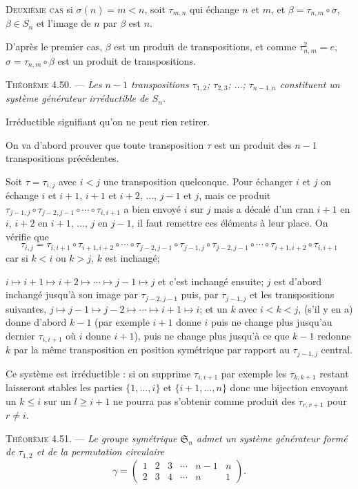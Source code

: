 \textsc{Deuxième cas} si $\sigma(n)=m<n$, soit $\tau_{m,n}$ qui échange $n$ et $m$, et $\beta=\tau_{n,m}\circ\sigma$, $\beta\in S_n$ et l'image de $n$ par $\beta$ est $n$.

D'après le premier cas, $\beta$ est un produit de transpositions, et comme $\tau_{n,m}^{2}=e$, $\sigma=\tau_{n,m}\circ\beta$ est un produit de transpositions. \bookend

\medskip\noindent\textsc{Théorème 4.50.} --- \emph{Les $n-1$ transpositions $\tau_{1,2}$; $\tau_{2,3}$; $\ldots$; $\tau_{n-1,n}$ constituent un système générateur irréductible de $S_n$.}

Irréductible signifiant qu'on ne peut rien retirer.

On va d'abord prouver que toute transposition $\tau$ est un produit des $n-1$ transpositions précédentes.

Soit $\tau=\tau_{i,j}$ avec $i<j$ une transposition quelconque. Pour échanger $i$ et $j$ on échange $i$ et $i+1$, $i+1$ et $i+2$, $\ldots$, $j-1$ et $j$, mais ce produit $\tau_{j-1,j}\circ\tau_{j-2,j-1}\circ\cdots\circ\tau_{i,i+1}$ a bien envoyé $i$ sur $j$ mais a décalé d'un cran $i+1$ en $i$, $i+2$ en $i+1$, $\ldots$, $j$ en $j-1$, il faut remettre ces éléments à leur place. On vérifie que
\[
\tau_{i,j}=
\tau_{i,i+1}\circ\tau_{i+1,i+2}\circ\cdots\circ\tau_{j-2,j-1}\circ\tau_{j-1,j}
\circ\tau_{j-2,j-1}\circ\cdots\circ\tau_{i+1,i+2}\circ\tau_{i,i+1}
\]
car si $k<i$ ou $k>j$, $k$ est inchangé;

$i\mapsto i+1\mapsto i+2\mapsto\cdots\mapsto j-1\mapsto j$ et c'est inchangé ensuite; $j$ est d'abord inchangé jusqu'à son image par $\tau_{j-2,j-1}$ puis, par $\tau_{j-1,j}$ et les transpositions suivantes, $j\mapsto j-1\mapsto j-2\mapsto\cdots\mapsto i+1\mapsto i$; et un $k$ avec $i<k<j$, (s'il y en a) donne d'abord $k-1$ (par exemple $i+1$ donne $i$ puis ne change plus jusqu'au dernier $\tau_{i,i+1}$ où $i$ donne $i+1$), puis ne change plus jusqu'à ce que $k-1$ redonne $k$ par la même transposition en position symétrique par rapport au $\tau_{j-1,j}$ central.

Ce système est irréductible : si on supprime $\tau_{i,i+1}$ par exemple les $\tau_{k,k+1}$ restant laisseront stables les parties $\{1,\ldots,i\}$ et $\{i+1,\ldots,n\}$ donc une bijection envoyant un $k\le i$ sur un $l\ge i+1$ ne pourra pas s'obtenir comme produit des $\tau_{r,r+1}$ pour $r\ne i$. \bookend

\medskip\noindent\textsc{Théorème 4.51.} --- \emph{Le groupe symétrique $\mathfrak S_n$ admet un système générateur formé de $\tau_{1,2}$ et de la permutation circulaire
\[
\gamma=\begin{pmatrix}1&2&3&\cdots&n-1&n\\2&3&4&\cdots&n&1\end{pmatrix}.
\]}

